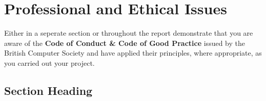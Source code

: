 \chapter{Professional and Ethical Issues}
Either in a seperate section or throughout the report demonstrate that you are aware of the \textbf{Code of Conduct \& Code of Good Practice} issued by the British Computer Society and have applied their principles, where appropriate, as you carried out your project.

\section{Section Heading}
